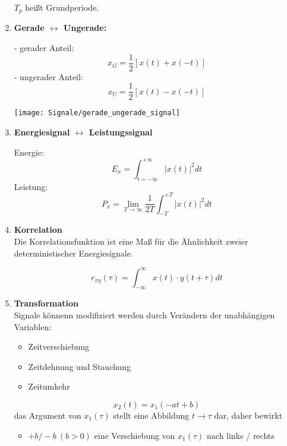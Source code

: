\begin{enumerate}
\begin{mdframed}[style=exercise]
              $T_p$ hei{\ss}t Grundperiode.
          \end{mdframed}
      \item{\textbf{Gerade \hfill $\longleftrightarrow$ \hfill Ungerade:}}\\
          \begin{mdframed}[style=exercise,frametitle=Zerlegung des Signals:]
              - gerader Anteil: \[x_G=\frac{1}{2}\left[x(t)+x(-t)\right]\]
              - ungerader Anteil: \[x_U=\frac{1}{2}\left[ x(t)-x(-t) \right]\]
          \end{mdframed}
          \begin{center}
              \texttt{[image: Signale/gerade\_ungerade\_signal]}
          \end{center}
      \item{\textbf{Energiesignal \hfill $\longleftrightarrow$ \hfill Leistungssignal}}
          \begin{mdframed}[style=exercise]
              Energie: \[E_x=\int_{t=-\infty}^{+\infty}\lvert x(t)\rvert^2 dt\]
              Leistung: \[P_x=\lim_{T\to\infty}\frac{1}{2T}\int_{-T}^{+T}\lvert x(t)\rvert^2 dt\]
          \end{mdframed}
      \item{\textbf{Korrelation}}\\
          Die Korrelationsfunktion ist eine Ma{\ss} f\"ur die \"Ahnlichkeit
          zweier deterministischer Energiesignale.
          \begin{mdframed}[style=exercise,frametitle=Korrelationsfunktion]
              \[
                  r_{xy}(\tau) = \int_{-\infty}^{\infty}x(t)\cdot y(t+\tau)dt
              \]
          \end{mdframed}
      \item{\textbf{Transformation}}\\
          Signale k\"onnenn modifiziert werden durch Ver\"andern der
          unabh\"angigen Variablen:
          \begin{itemize}
              \item Zeitverschiebung
              \item Zeitdehnung und Stauchung
              \item Zeitumkehr
          \end{itemize}
          \begin{mdframed}[style=exercise]
              \[
                  x_2(t) = x_1(-at+b)
              \]
          das Argument von $x_1(\tau)$ stellt eine Abbildung $t\rightarrow\tau$
          dar, daher bewirkt
          \begin{itemize}
              \item{$+b / -b\ (b > 0)$ eine Verschiebung von $x_1(\tau)$ nach links / rechts}


\end{itemize}
\end{mdframed}
\end{enumerate}
